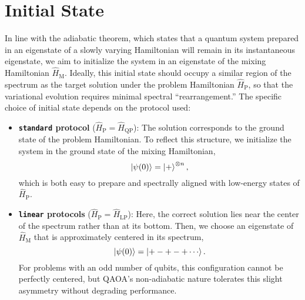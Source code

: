 \section{Initial State}
\label{Section:InitialState}

In line with the adiabatic theorem, which states that a quantum system prepared in an eigenstate of a slowly varying Hamiltonian will remain in its instantaneous eigenstate, we aim to initialize the system in an eigenstate of the mixing Hamiltonian $\hat{H}_\mathrm{M}$. Ideally, this initial state should occupy a similar region of the spectrum as the target solution under the problem Hamiltonian $\hat{H}_\mathrm{P}$, so that the variational evolution requires minimal spectral “rearrangement.” The specific choice of initial state depends on the protocol used:

\begin{itemize}
    \item \textbf{\texttt{standard} protocol} ($\hat{H}_\mathrm{P} = \hat{H}_\mathrm{QP}$): The solution corresponds to the ground state of the problem Hamiltonian. To reflect this structure, we initialize the system in the ground state of the mixing Hamiltonian, $$\ket{\psi (0)} = \ket{+}^{\otimes n},$$ which is both easy to prepare and spectrally aligned with low-energy states of $\hat{H}_\mathrm{P}$.

    \item \textbf{\texttt{linear} protocols} ($\hat{H}_\mathrm{P} = \hat{H}_\mathrm{LP}$): Here, the correct solution lies near the center of the spectrum rather than at its bottom. Then, we choose an eigenstate of $\hat{H}_\mathrm{M}$ that is approximately centered in its spectrum, $$\ket{\psi (0)} = \ket{+-+-+\cdots}.$$ For problems with an odd number of qubits, this configuration cannot be perfectly centered, but QAOA's non-adiabatic nature tolerates this slight asymmetry without degrading performance.
\end{itemize}
